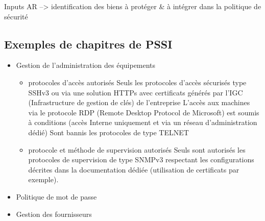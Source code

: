 Inputs AR --> identification des biens à protéger \& à intégrer dans la politique de sécurité


\subsection{Exemples de chapitres de PSSI}
\begin{itemize}
    \item Gestion de l’administration des équipements
    \begin{itemize}
        \item protocoles d’accès autorisés
        Seuls les protocoles d'accès sécurisés type SSHv3 ou via une solution HTTPs avec certificats générés par l'IGC (Infrastructure de gestion de clés) de l'entreprise
        L'accès aux machines via le protocole RDP (Remote Desktop Protocol de Microsoft) est soumis à conditions (accès Interne uniquement et via un réseau d'administration dédié)
        Sont bannis les protocoles de type TELNET
        \item protocole et méthode de supervision autorisés
        Seuls sont autorisés les protocoles de supervision de type SNMPv3 respectant les configurations décrites dans la documentation dédiée (utilisation de certificats par exemple).
    \end{itemize}
    \item Politique de mot de passe
    \item Gestion des fournisseurs
\end{itemize}

